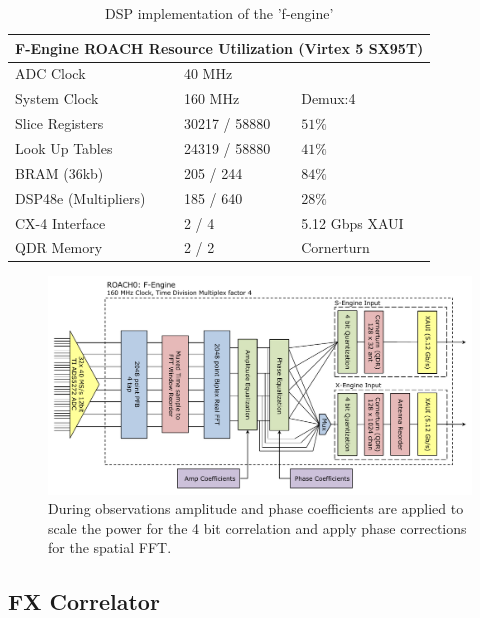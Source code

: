\documentclass[useAMS,macros,usenatbib,onecolumn]{mn2e}
\begin{document}
\begin{table}
\begin{center}
\begin{tabular}{| l | l | l |}
\hline
\multicolumn{3}{|c|}{F-Engine ROACH Resource Utilization (Virtex 5 SX95T)}\\
\hline
ADC Clock 		& 40 MHz \\
System Clock 		& 160 MHz 	& Demux:4 \\
Slice Registers 	& 30217 / 58880 & $51\%$\\
Look Up Tables 		& 24319 / 58880 & $41\%$\\
BRAM (36kb) 		& 205 / 244 	& $84\%$\\
DSP48e (Multipliers) 	& 185 / 640 	& $28\%$\\
CX-4 Interface 		& 2 / 4 	& 5.12 Gbps XAUI\\
QDR Memory 		& 2 / 2 	& Cornerturn\\
\hline
\end{tabular}
\caption{DSP implementation of the 'f-engine'}
\label{tbl:feng_resource}
\end{center}
\end{table}

\begin{figure}
    \centering
    \includegraphics[scale=0.6]{graphics/crop_fengine_block.pdf}
    \caption{During observations amplitude and phase coefficients are applied to scale the power for the 4 bit correlation and apply phase corrections for the spatial FFT.}
    \label{fig:feng_block}
\end{figure}

\subsection{FX Correlator}
\label{correlator}
\end{document}
